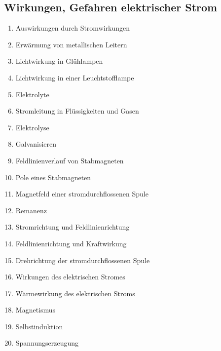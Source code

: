 \subsection{Wirkungen, Gefahren elektrischer
Strom}\label{wirkungen-gefahren-elektrischer-strom}

\begin{enumerate}
\item
  Auswirkungen durch Stromwirkungen\\
\item
  Erwärmung von metallischen Leitern\\
\item
  Lichtwirkung in Glühlampen\\
\item
  Lichtwirkung in einer Leuchtstofflampe\\
\item
  Elektrolyte\\
\item
  Stromleitung in Flüssigkeiten und Gasen\\
\item
  Elektrolyse\\
\item
  Galvanisieren\\
\item
  Feldlinienverlauf von Stabmagneten\\
\item
  Pole eines Stabmagneten\\
\item
  Magnetfeld einer stromdurchflossenen Spule\\
\item
  Remanenz\\
\item
  Stromrichtung und Feldlinienrichtung\\
\item
  Feldlinienrichtung und Kraftwirkung\\
\item
  Drehrichtung der stromdurchflossenen Spule\\
\item
  Wirkungen des elektrischen Stromes\\
\item
  Wärmewirkung des elektrischen Stroms\\
\item
  Magnetismus\\
\item
  Selbstinduktion\\
\item
  Spannungserzeugung
\end{enumerate}

